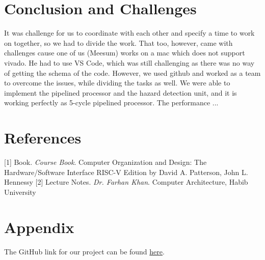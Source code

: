 \documentclass[12pt]{article}
\begin{document}
\section{Conclusion and Challenges}\label{performance}
    It was challenge for us to coordinate with each other and specify a time to work on together, so we had to divide the work. That too, however, came with challenges cause one of us (Meesum) works on a mac which does not support vivado. He had to use VS Code, which was still challenging as there was no way of getting the schema of the code. However, we used github and worked as a team to overcome the issues, while dividing the tasks as well. We were able to implement the pipelined processor and the hazard detection unit, and it is working perfectly as 5-cycle pipelined processor. The performance ... 

\section{References}

[1] Book. \textit{Course Book}. Computer Organization and Design: The Hardware/Software Interface RISC-V Edition by David A. Patterson, John L. Hennessy
[2] Lecture Notes. \textit{Dr. Farhan Khan}. Computer Architecture, Habib University

\section{Appendix}
The GitHub link for our project can be found \href{https://github.com/RaahimHash/Pipelined-RISC-V-Processor}{here}.

    
\end{document}
